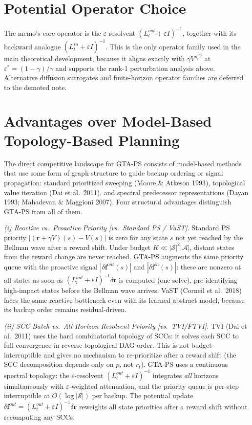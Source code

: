 \documentclass[10pt,a4paper]{article}
\begin{document}
\section{Potential Operator Choice}

The memo's core operator is the $\varepsilon$-resolvent $(L^{out}_t+\varepsilon I)^{-1}$, together with its backward analogue $(L^{in}_t+\varepsilon I)^{-1}$.  This is the only operator family used in the main theoretical development, because it aligns exactly with $\gamma V^{\pi_t^{\mathrm{PS}}}$ at $\varepsilon^*=(1-\gamma)/\gamma$ and supports the rank-1 perturbation analysis above.  Alternative diffusion surrogates and finite-horizon operator families are deferred to the demoted note.



\section{Advantages over Model-Based Topology-Based Planning}

The direct competitive landscape for GTA-PS consists of model-based methods
that use some form of graph structure to guide backup ordering or signal
propagation: standard prioritized sweeping (Moore \& Atkeson 1993),
topological value iteration (Dai et al.\ 2011), and spectral
predecessor representations (Dayan 1993; Mahadevan \& Maggioni 2007).
Four structural advantages distinguish GTA-PS from all of them.

\textit{(i) Reactive vs.\ Proactive Priority [vs.\ Standard PS / VaST].}
Standard PS priority $|(\mathbf{r} + \gamma V)(s) - V(s)|$ is zero for any state $s$
not yet reached by the Bellman wave after a reward shift.
Under budget $K \ll |\mathcal{S}|^2|\mathcal{A}|$, distant states from the
reward change are never reached.
GTA-PS augments the same priority queue with the proactive signal
$|\delta\mathbf{f}^{out}(s)|$ and $|\delta\mathbf{f}^{in}(s)|$:
these are nonzero at all states as soon as $(L^{out}_t+\varepsilon I)^{-1}\delta\mathbf{r}$
is computed (one solve), pre-identifying high-impact states before the Bellman
wave arrives.
VaST (Corneil et al.\ 2018) faces the same reactive bottleneck even with
its learned abstract model, because its backup order remains residual-driven.

\textit{(ii) SCC-Batch vs.\ All-Horizon Resolvent Priority [vs.\ TVI/FTVI].}
TVI (Dai et al.\ 2011) uses the hard combinatorial topology of SCCs:
it solves each SCC to full convergence in reverse topological DAG order.
This is not budget-interruptible and gives no mechanism to re-prioritize after
a reward shift (the SCC decomposition depends only on $p$, not $r_t$).
GTA-PS uses a continuous spectral topology: the $\varepsilon$-resolvent
$(L^{out}_t+\varepsilon I)^{-1}$ integrates \emph{all} horizons simultaneously
with $\varepsilon$-weighted attenuation, and the priority queue is per-step
interruptible at $O(\log|\mathcal{S}|)$ per backup.
The potential update $\delta\mathbf{f}^{out} = (L^{out}_t+\varepsilon I)^{-1}\delta\mathbf{r}$
reweights all state priorities after a reward shift without recomputing any SCCs.
\end{document}
